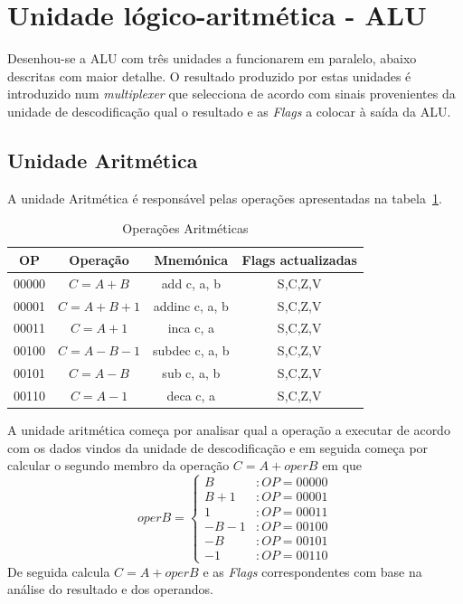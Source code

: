 \section{Unidade lógico-aritmética - ALU}

Desenhou-se a ALU com três unidades a funcionarem em paralelo, abaixo descritas com maior detalhe.
O resultado produzido por estas unidades é introduzido num \textit{multiplexer} que selecciona de acordo com sinais provenientes da unidade de descodificação qual o resultado e as \textit{Flags} a colocar à saída da ALU.


\subsection{Unidade Aritmética}
A unidade Aritmética é responsável pelas operações apresentadas na tabela~\ref{tabela:arith}.

\begin{table}[h]
	\centering
	\begin{tabular}{|c|c|c|c|}
		\hline
		OP    & Operação & Mnemónica & Flags actualizadas \\ \hline
		00000 & \mbox{$C=A+B$}    & add c, a, b    & S,C,Z,V   \\ \hline
		00001 & \mbox{$C=A+B+1$}  & addinc c, a, b & S,C,Z,V   \\ \hline
		00011 & \mbox{$C=A+1$}    & inca c, a      & S,C,Z,V   \\ \hline
		00100 & \mbox{$C=A-B-1$}  & subdec c, a, b & S,C,Z,V   \\ \hline
		00101 & \mbox{$C=A-B$}    & sub c, a, b    & S,C,Z,V   \\ \hline
		00110 & \mbox{$C=A-1$}    & deca c, a      & S,C,Z,V   \\ \hline
	\end{tabular}
	\caption{Operações Aritméticas}
	\label{tabela:arith}
\end{table}

A unidade aritmética começa por analisar qual a operação a executar de acordo com os dados vindos da unidade de descodificação e em seguida começa por calcular o segundo membro da operação \mbox{$C=A+operB$} em que 
\[ operB=\left\{
\begin{array}{lr}
B & : OP=00000\\
B+1 & : OP=00001\\
1 & : OP=00011\\
-B-1 & : OP=00100\\
-B & : OP=00101\\
-1 & : OP=00110
\end{array}
\right.\]
De seguida calcula \mbox{$C=A+operB$} e as \textit{Flags} correspondentes com base na análise do resultado e dos operandos.


